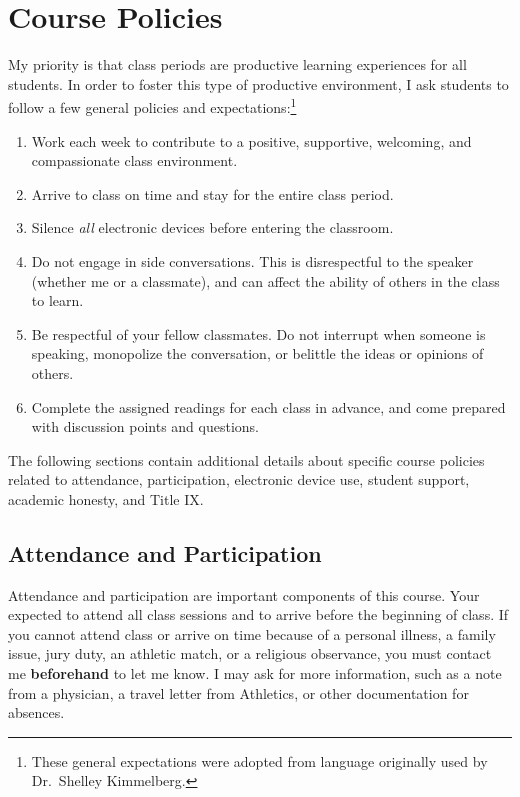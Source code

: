 \documentclass[]{book}
\providecommand{\tightlist}{%
  \setlength{\itemsep}{0pt}\setlength{\parskip}{0pt}}
\let\rmarkdownfootnote\footnote%
\def\footnote{\protect\rmarkdownfootnote}
\begin{document}
\hypertarget{course-policies}{%
\chapter{Course Policies}\label{course-policies}}

My priority is that class periods are productive learning experiences for all students. In order to foster this type of productive environment, I ask students to follow a few general policies and expectations:\footnote{These general expectations were adopted from language originally used by Dr.~Shelley Kimmelberg.}

\begin{enumerate}
\def\labelenumi{\arabic{enumi}.}
\tightlist
\item
  Work each week to contribute to a positive, supportive, welcoming, and compassionate class environment.
\item
  Arrive to class on time and stay for the entire class period.
\item
  Silence \emph{all} electronic devices before entering the classroom.
\item
  Do not engage in side conversations. This is disrespectful to the speaker (whether me or a classmate), and can affect the ability of others in the class to learn.
\item
  Be respectful of your fellow classmates. Do not interrupt when someone is speaking, monopolize the conversation, or belittle the ideas or opinions of others.
\item
  Complete the assigned readings for each class in advance, and come prepared with discussion points and questions.
\end{enumerate}

The following sections contain additional details about specific course policies related to attendance, participation, electronic device use, student support, academic honesty, and Title IX.

\hypertarget{attendance-and-participation}{%
\section{Attendance and Participation}\label{attendance-and-participation}}

Attendance and participation are important components of this course. Your expected to attend all class sessions and to arrive before the beginning of class. If you cannot attend class or arrive on time because of a personal illness, a family issue, jury duty, an athletic match, or a religious observance, you must contact me \textbf{beforehand} to let me know. I may ask for more information, such as a note from a physician, a travel letter from Athletics, or other documentation for absences.
\end{document}
